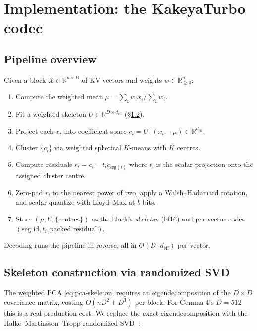 \documentclass[11pt,a4paper]{article}
\theoremstyle{definition}
\theoremstyle{plain}
\newcommand{\R}{\mathbb{R}}
\begin{document}
\section{Implementation: the KakeyaTurbo codec}
\label{sec:implementation}

\subsection{Pipeline overview}
Given a block $X \in \R^{n \times D}$ of KV vectors and weights $w \in \R_{\geq 0}^n$:
\begin{enumerate}[leftmargin=*]
  \item Compute the weighted mean $\mu = \sum_i w_i x_i / \sum_i w_i$.
  \item Fit a weighted skeleton $U \in \R^{D \times d_{\text{eff}}}$ (\S\ref{sec:skeleton}).
  \item Project each $x_i$ into coefficient space $c_i = U^\top (x_i - \mu) \in \R^{d_{\text{eff}}}$.
  \item Cluster $\{c_i\}$ via weighted spherical $K$-means with $K$ centres.
  \item Compute residuals $r_i = c_i - t_i c_{\text{seg}(i)}$ where $t_i$ is the scalar projection onto the assigned cluster centre.
  \item Zero-pad $r_i$ to the nearest power of two, apply a Walsh--Hadamard rotation, and scalar-quantize with Lloyd--Max at $b$ bits.
  \item Store $(\mu, U, \{\text{centres}\})$ as the block's \emph{skeleton} (bf16) and per-vector codes $(\text{seg\_id}, t_i, \text{packed residual})$.
\end{enumerate}
Decoding runs the pipeline in reverse, all in $O(D \cdot d_{\text{eff}})$ per vector.

\subsection{Skeleton construction via randomized SVD}
\label{sec:skeleton}

The weighted PCA \eqref{eq:pca-skeleton} requires an eigendecomposition of the $D \times D$ covariance matrix, costing $O(nD^2 + D^3)$ per block. For Gemma-4's $D = 512$ this is a real production cost. We replace the exact eigendecomposition with the Halko--Martinsson--Tropp randomized SVD~\cite{halko-martinsson-tropp}:
\end{document}
